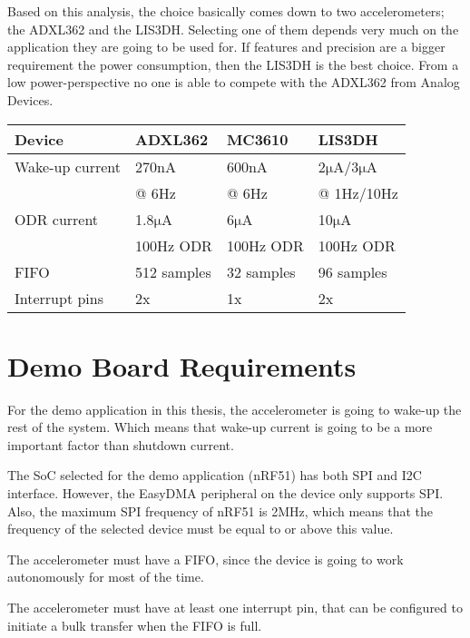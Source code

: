 Based on this analysis, the choice basically comes down to two accelerometers; the ADXL362 and the LIS3DH. Selecting one of them depends very much on the application they are going to be used for. If features and precision are a bigger requirement the power consumption, then the LIS3DH is the best choice. From a low power-perspective no one is able to compete with the ADXL362 from Analog Devices.

\begin{center}
    \begin{tabular}{| l | l | l | l |}
    \hline
    Device & ADXL362 & MC3610 & LIS3DH \\ \hline
    Wake-up current & 270nA & 600nA & 2$\si{\micro\ampere}$/3$\si{\micro\ampere}$ \\
     & @ 6Hz & @ 6Hz & @ 1Hz/10Hz \\ \hline
    ODR current & 1.8$\si{\micro\ampere}$ & 6$\si{\micro\ampere}$ & 10$\si{\micro\ampere}$ \\
     & 100Hz ODR & 100Hz ODR & 100Hz ODR \\ \hline
    FIFO & 512 samples & 32 samples & 96 samples \\ \hline
    Interrupt pins & 2x & 1x & 2x \\ \hline

    \end{tabular}
\end{center}

\section{Demo Board Requirements}

For the demo application in this thesis, the accelerometer is going to wake-up the rest of the system. Which means that wake-up current is going to be a more important factor than shutdown current. 

The SoC selected for the demo application (nRF51) has both SPI and I2C interface. However, the EasyDMA peripheral on the device only supports SPI. Also, the maximum SPI frequency of nRF51 is 2MHz, which means that the frequency of the selected device must be equal to or above this value.

The accelerometer must have a FIFO, since the device is going to work autonomously for most of the time. 

The accelerometer must have at least one interrupt pin, that can be configured to initiate a bulk transfer when the FIFO is full.

